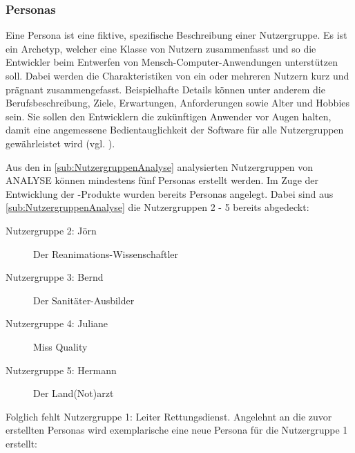 \subsubsection{Personas}
Eine Persona ist eine fiktive, spezifische Beschreibung einer Nutzergruppe.
Es ist ein \gls{Archetyp}, welcher eine Klasse von Nutzern zusammenfasst und so die Entwickler beim Entwerfen von Mensch-Computer-Anwendungen unterstützen soll.
Dabei werden die Charakteristiken von ein oder mehreren Nutzern kurz und prägnant zusammengefasst.
Beispielhafte Details können unter anderem die Berufsbeschreibung, Ziele, Erwartungen, Anforderungen sowie Alter und Hobbies sein.
Sie sollen den Entwicklern die zukünftigen Anwender vor Augen halten, damit eine angemessene Bedientauglichkeit der Software für alle Nutzergruppen gewährleistet wird (vgl. \cite[3.2, S.11]{Karwowski.2011,Pruitt.2006}).

Aus den in \ref{sub:NutzergruppenAnalyse} analysierten Nutzergruppen von \gls{ANALYSE} können mindestens fünf Personas erstellt werden.
Im Zuge der Entwicklung der \cweb-Produkte wurden bereits Personas angelegt.
Dabei sind aus \ref{sub:NutzergruppenAnalyse} die Nutzergruppen 2 - 5 bereits abgedeckt:
\begin{description}
\item[Nutzergruppe 2: Jörn]
	\glqq Der Reanimations-Wissenschaftler\grqq 
\item[Nutzergruppe 3: Bernd]
	\glqq Der Sanitäter-Ausbilder\grqq 
\item[Nutzergruppe 4: Juliane]
	\glqq Miss Quality\grqq
\item[Nutzergruppe 5: Hermann]
	\glqq Der Land(Not)arzt\grqq
\end{description}

Folglich fehlt Nutzergruppe 1: Leiter Rettungsdienst.
Angelehnt an die zuvor erstellten Personas wird exemplarische eine neue Persona für die Nutzergruppe 1 erstellt:

